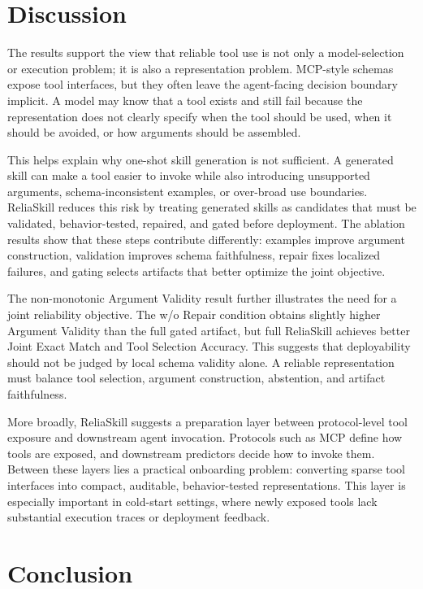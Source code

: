 \documentclass[11pt]{article}
\newcommand{\method}{ReliaSkill}
\begin{document}
\section{Discussion}
\label{sec:discussion}

The results support the view that reliable tool use is not only a model-selection or execution problem; it is also a representation problem. MCP-style schemas expose tool interfaces, but they often leave the agent-facing decision boundary implicit. A model may know that a tool exists and still fail because the representation does not clearly specify when the tool should be used, when it should be avoided, or how arguments should be assembled.

This helps explain why one-shot skill generation is not sufficient. A generated skill can make a tool easier to invoke while also introducing unsupported arguments, schema-inconsistent examples, or over-broad use boundaries. \method{} reduces this risk by treating generated skills as candidates that must be validated, behavior-tested, repaired, and gated before deployment. The ablation results show that these steps contribute differently: examples improve argument construction, validation improves schema faithfulness, repair fixes localized failures, and gating selects artifacts that better optimize the joint objective.

The non-monotonic Argument Validity result further illustrates the need for a joint reliability objective. The w/o Repair condition obtains slightly higher Argument Validity than the full gated artifact, but full \method{} achieves better Joint Exact Match and Tool Selection Accuracy. This suggests that deployability should not be judged by local schema validity alone. A reliable representation must balance tool selection, argument construction, abstention, and artifact faithfulness.

More broadly, \method{} suggests a preparation layer between protocol-level tool exposure and downstream agent invocation. Protocols such as MCP define how tools are exposed, and downstream predictors decide how to invoke them. Between these layers lies a practical onboarding problem: converting sparse tool interfaces into compact, auditable, behavior-tested representations. This layer is especially important in cold-start settings, where newly exposed tools lack substantial execution traces or deployment feedback.

\section{Conclusion}
\label{sec:conclusion}
\end{document}
